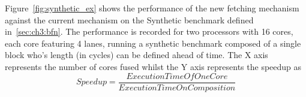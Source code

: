 Figure~\ref{fig:synthetic_ex} shows the performance of the new fetching mechanism against the current mechanism on the Synthetic benchmark defined in~\ref{sec:ch3:bfn}.
The performance is recorded for two processors with 16 cores, each core featuring 4 lanes, running a synthetic benchmark composed of a single block who's length (in cycles) can be defined ahead of time.
The X axis represents the number of cores fused whilst the Y axis represents the speedup as 
\begin{equation}
Speedup = \frac{ExecutionTimeOfOneCore}{ExecutionTimeOnComposition}
\end{equation}
